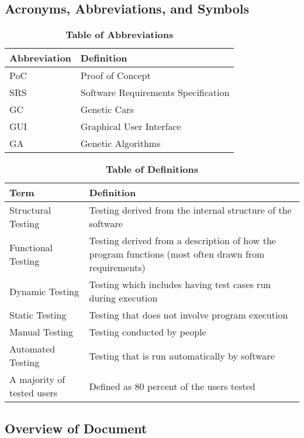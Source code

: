 \documentclass[12pt, titlepage]{article}
\begin{document}
\subsection{Acronyms, Abbreviations, and Symbols}
	
\begin{table}[hbp]
\caption{\textbf{Table of Abbreviations}} \label{Table}

\begin{tabularx}{\textwidth}{p{3cm}X}
\toprule
\textbf{Abbreviation} & \textbf{Definition} \\
\midrule
PoC & Proof of Concept\\
SRS & Software Requirements Specification\\
GC & Genetic Cars\\
GUI & Graphical User Interface\\
GA & Genetic Algorithms\\
\bottomrule
\end{tabularx}

\end{table}

\begin{table}[!htbp]
\caption{\textbf{Table of Definitions}} \label{Table}

\begin{tabularx}{\textwidth}{p{3cm}X}
\toprule
\textbf{Term} & \textbf{Definition}\\
\midrule
Structural Testing & Testing derived from the internal structure of the 
software\\
Functional Testing & Testing derived from a description of how the program 
functions (most often drawn from requirements)\\
Dynamic Testing & Testing which includes having test cases run during 
execution\\
Static Testing & Testing that does not involve program execution\\
Manual Testing & Testing conducted by people\\
Automated Testing & Testing that is run automatically by software\\
A majority of tested users & Defined as 80 percent of the users tested\\
\bottomrule
\end{tabularx}

\end{table}	

\subsection{Overview of Document}
\end{document}
